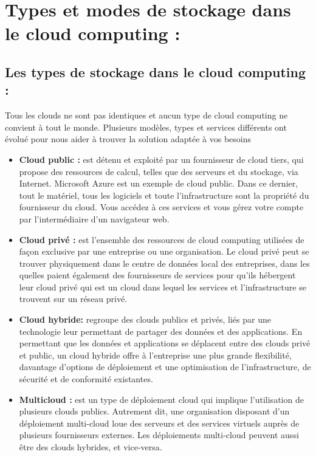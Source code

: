 \section{Types et modes de stockage dans le cloud computing :}
\subsection{Les types de stockage dans le cloud computing : }
Tous les clouds ne sont pas identiques et aucun type de cloud computing ne convient à tout le monde. Plusieurs modèles, types et services différents ont évolué pour nous aider à trouver la solution adaptée à vos besoins

\begin{itemize}[label=\textbullet]
\item \textbf{Cloud public :} est détenu et exploité par un fournisseur de cloud tiers, qui propose des ressources de calcul, telles que des serveurs et du stockage, via Internet. Microsoft Azure est un exemple de cloud public. Dans ce dernier, tout le matériel, tous les logiciels et toute l’infrastructure sont la propriété du fournisseur du cloud. Vous accédez à ces services et vous gérez votre compte par l’intermédiaire d’un navigateur web. 
\item \textbf{Cloud privé :} est l’ensemble des ressources de cloud computing utilisées de façon exclusive par une entreprise ou une organisation. Le cloud privé peut se trouver physiquement dans le centre de données local des entreprises, dans les quelles paient également des fournisseurs de services pour qu’ils hébergent leur cloud privé qui est un cloud dans lequel les services et l’infrastructure se trouvent sur un réseau privé. 
\item \textbf{Cloud hybride:} regroupe des clouds publics et privés, liés par une technologie leur permettant de partager des données et des applications. En permettant que les données et applications se déplacent entre des clouds privé et public, un cloud hybride offre à l’entreprise une plus grande flexibilité, davantage d’options de déploiement et une optimisation de l’infrastructure, de sécurité et de conformité existantes.
\item \textbf{Multicloud :} est un type de déploiement cloud qui implique l'utilisation de plusieurs clouds publics. Autrement dit, une organisation disposant d’un déploiement multi-cloud loue des serveurs et des services virtuels auprès de plusieurs fournisseurs externes. Les déploiements multi-cloud peuvent aussi être des clouds hybrides, et vice-versa.
\end{itemize}


